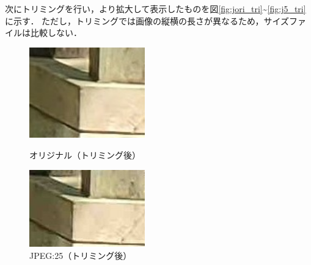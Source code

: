 \documentclass[a4paper,11pt]{bxjsarticle}
\begin{document}
次にトリミングを行い，より拡大して表示したものを図\ref{fig:jori_tri}\textasciitilde\ref{fig:j5_tri}に示す．
ただし，トリミングでは画像の縦横の長さが異なるため，サイズファイルは比較しない．

\begin{figure}[htbp]
  \begin{minipage}{0.5\hsize}
   \begin{center}
    \includegraphics[width=50mm]{sample_tri.jpg}
   \end{center}
   \caption{オリジナル（トリミング後）}
   \label{fig:jori_tri}
  \end{minipage}
  \begin{minipage}{0.5\hsize}
   \begin{center}
    \includegraphics[width=50mm]{sample_j25_tri.jpg}
   \end{center}
   \caption{JPEG:25（トリミング後）}
   \label{fig:j25_tri}
  \end{minipage}
 \end{figure}
\end{document}
